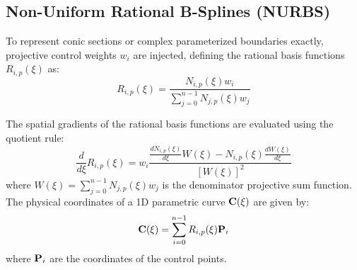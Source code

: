 \subsection{Non-Uniform Rational B-Splines (NURBS)}
To represent conic sections or complex parameterized boundaries exactly, projective control weights $w_i$ are injected, defining the rational basis functions $R_{i,p}(\xi)$ as:
\begin{equation}
    R_{i,p}(\xi) = \frac{N_{i,p}(\xi) w_i}{\sum_{j=0}^{n-1} N_{j,p}(\xi) w_j}
\end{equation}

The spatial gradients of the rational basis functions are evaluated using the quotient rule:
\begin{equation}
    \frac{d}{d\xi} R_{i,p}(\xi) = w_i \frac{\frac{d N_{i,p}(\xi)}{d\xi} W(\xi) - N_{i,p}(\xi) \frac{d W(\xi)}{d\xi}}{[W(\xi)]^2}
\end{equation}
where $W(\xi) = \sum_{j=0}^{n-1} N_{j,p}(\xi) w_j$ is the denominator projective sum function. The physical coordinates of a 1D parametric curve $\mathbf{C}(\xi)$ are given by:
\begin{equation}
    \mathbf{C}(\xi) = \sum_{i=0}^{n-1} R_{i,p}(\xi) \mathbf{P}_i
\end{equation}
where $\mathbf{P}_i$ are the coordinates of the control points.

